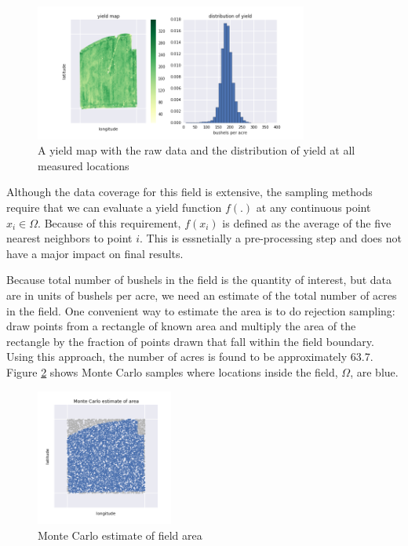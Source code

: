 \documentclass{article} %
\begin{document}
\begin{figure}
\begin{center}
\includegraphics[width=0.8\textwidth]{figures/raw_data}
\caption{A yield map with the raw data and the distribution of yield at all measured locations}%
\label{fig:raw}
\end{center}
\end{figure}

Although the data coverage for this field is extensive, the sampling methods require that we can evaluate a yield function $f(.)$ at any continuous point $x_i \in \Omega$. Because of this requirement, $f(x_i)$ is defined as the average of the five nearest neighbors to point $i$. This is essnetially a pre-processing step and does not have a major impact on final results.

Because total number of bushels in the field is the quantity of interest, but data are in units of bushels per acre, we need an estimate of the total number of acres in the field. One convenient way to estimate the area is to do rejection sampling: draw points from a rectangle of known area and multiply the area of the rectangle by the fraction of points drawn that fall within the field boundary. Using this approach, the number of acres is found to be approximately 63.7. Figure \ref{fig:mcarea} shows Monte Carlo samples where locations inside the field, $\Omega$, are blue.

\begin{figure}
\begin{center}
\includegraphics[width=0.4\textwidth]{figures/mc_area}
\caption{Monte Carlo estimate of field area}%
\label{fig:mcarea}
\end{center}
\end{figure}
\end{document}
